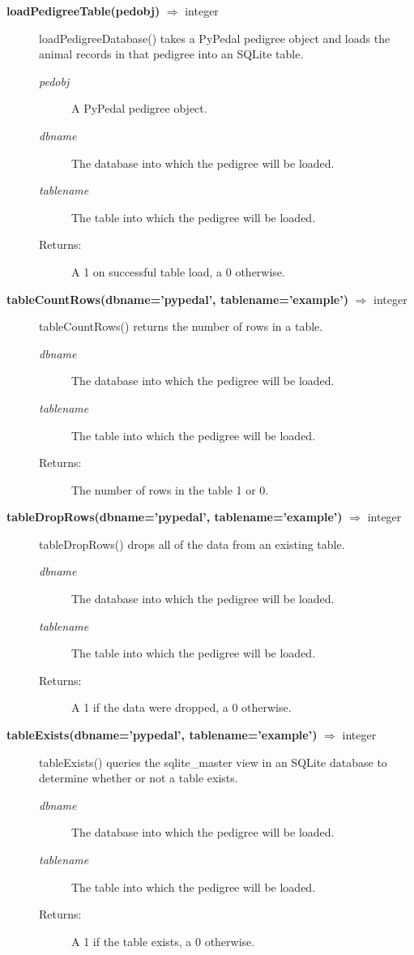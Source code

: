 \begin{description}
\item[\textbf{loadPedigreeTable(pedobj)} $\Rightarrow$ integer]
loadPedigreeDatabase() takes a PyPedal pedigree object and loads the animal records in that pedigree into an SQLite table.
\begin{description}
\item[\emph{pedobj}] A PyPedal pedigree object.
\item[\emph{dbname}] The database into which the pedigree will be loaded.
\item[\emph{tablename}] The table into which the pedigree will be loaded.
\item[Returns:] A 1 on successful table load, a 0 otherwise.
\end{description}

\item[\textbf{tableCountRows(dbname='pypedal', tablename='example')} $\Rightarrow$ integer]
tableCountRows() returns the number of rows in a table.
\begin{description}
\item[\emph{dbname}] The database into which the pedigree will be loaded.
\item[\emph{tablename}] The table into which the pedigree will be loaded.
\item[Returns:] The number of rows in the table 1 or 0.
\end{description}

\item[\textbf{tableDropRows(dbname='pypedal', tablename='example')} $\Rightarrow$ integer]
tableDropRows() drops all of the data from an existing table.
\begin{description}
\item[\emph{dbname}] The database into which the pedigree will be loaded.
\item[\emph{tablename}] The table into which the pedigree will be loaded.
\item[Returns:] A 1 if the data were dropped, a 0 otherwise.
\end{description}

\item[\textbf{tableExists(dbname='pypedal', tablename='example')} $\Rightarrow$ integer]
tableExists() queries the sqlite\_master view in an SQLite database to determine whether or not a table exists.
\begin{description}
\item[\emph{dbname}] The database into which the pedigree will be loaded.
\item[\emph{tablename}] The table into which the pedigree will be loaded.
\item[Returns:] A 1 if the table exists, a 0 otherwise.
\end{description}
\end{description}

